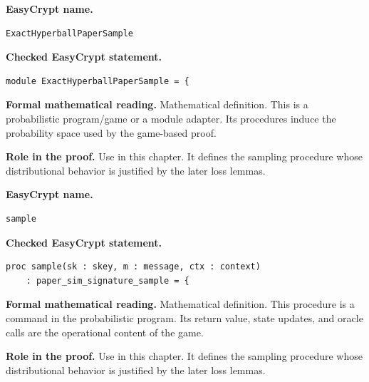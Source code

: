 \begin{formaldefinition}
\noindent\textbf{EasyCrypt name.}
\begin{lstlisting}[language=EasyCrypt,basicstyle=\ttfamily\scriptsize]
ExactHyperballPaperSample
\end{lstlisting}
\noindent\textbf{Checked EasyCrypt statement.}
\begin{lstlisting}[language=EasyCrypt,basicstyle=\ttfamily\scriptsize]
module ExactHyperballPaperSample = {
\end{lstlisting}
\noindent\textbf{Formal mathematical reading.}
Mathematical definition. This is a probabilistic program/game or a module adapter.  Its procedures induce the probability space used by the game-based proof.

\noindent\textbf{Role in the proof.}
Use in this chapter. It defines the sampling procedure whose distributional behavior is justified by the later loss lemmas.

\end{formaldefinition}

\begin{formaldefinition}
\noindent\textbf{EasyCrypt name.}
\begin{lstlisting}[language=EasyCrypt,basicstyle=\ttfamily\scriptsize]
sample
\end{lstlisting}
\noindent\textbf{Checked EasyCrypt statement.}
\begin{lstlisting}[language=EasyCrypt,basicstyle=\ttfamily\scriptsize]
proc sample(sk : skey, m : message, ctx : context)
    : paper_sim_signature_sample = {
\end{lstlisting}
\noindent\textbf{Formal mathematical reading.}
Mathematical definition. This procedure is a command in the probabilistic program.  Its return value, state updates, and oracle calls are the operational content of the game.

\noindent\textbf{Role in the proof.}
Use in this chapter. It defines the sampling procedure whose distributional behavior is justified by the later loss lemmas.

\end{formaldefinition}

